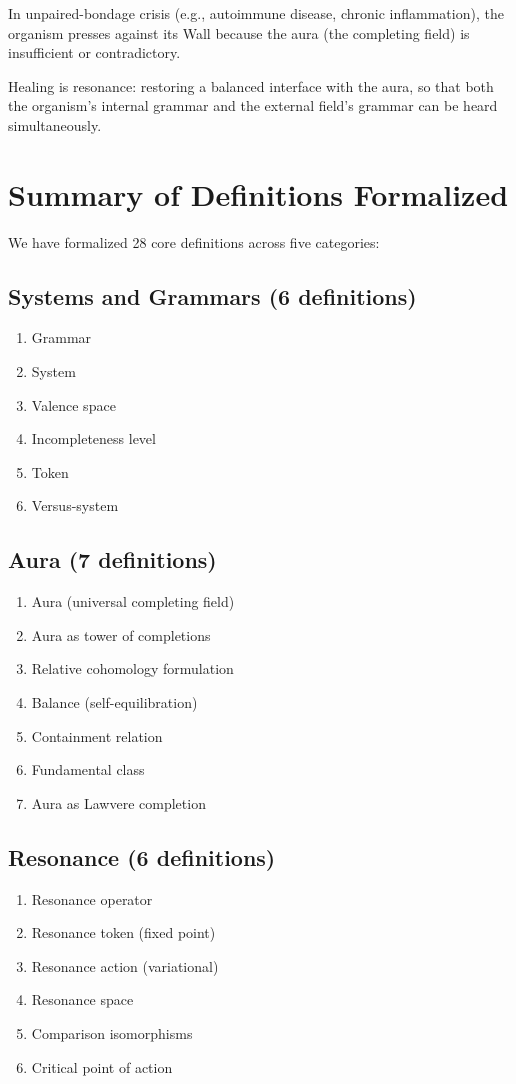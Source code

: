 \documentclass[12pt]{article}
\theoremstyle{definition}
\theoremstyle{remark}
\begin{document}
In unpaired-bondage crisis (e.g., autoimmune disease, chronic inflammation), the organism presses against its Wall because the aura (the completing field) is insufficient or contradictory.

Healing is resonance: restoring a balanced interface with the aura, so that both the organism's internal grammar and the external field's grammar can be heard simultaneously.

\section{Summary of Definitions Formalized}

We have formalized 28 core definitions across five categories:

\subsection{Systems and Grammars (6 definitions)}
\begin{enumerate}
\item Grammar
\item System
\item Valence space
\item Incompleteness level
\item Token
\item Versus-system
\end{enumerate}

\subsection{Aura (7 definitions)}
\begin{enumerate}
\item Aura (universal completing field)
\item Aura as tower of completions
\item Relative cohomology formulation
\item Balance (self-equilibration)
\item Containment relation
\item Fundamental class
\item Aura as Lawvere completion
\end{enumerate}

\subsection{Resonance (6 definitions)}
\begin{enumerate}
\item Resonance operator
\item Resonance token (fixed point)
\item Resonance action (variational)
\item Resonance space
\item Comparison isomorphisms
\item Critical point of action
\end{enumerate}
\end{document}
